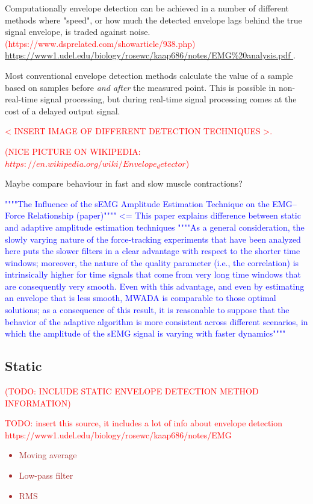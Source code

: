 Computationally envelope detection can be achieved in a number of different methods where "speed", or how much the detected envelope lags behind the true signal envelope, is traded against noise. \textcolor{red}{(https://www.dsprelated.com/showarticle/938.php) \url{https://www1.udel.edu/biology/rosewc/kaap686/notes/EMG%
}}.

Most conventional envelope detection methods calculate the value of a sample based on samples before \textit{and after} the measured point. This is possible in non-real-time signal processing, but during real-time signal processing comes at the cost of a delayed output signal.

\textcolor{red}{< INSERT IMAGE OF DIFFERENT DETECTION TECHNIQUES >.}

\textcolor{red}{(NICE PICTURE ON WIKIPEDIA:  $https://en.wikipedia.org/wiki/Envelope_detector$) }

Maybe compare behaviour in fast and slow muscle contractions?

\textcolor{blue}{""""The Influence of the sEMG Amplitude Estimation Technique on
the EMG–Force Relationship (paper)"""" <= This paper explains difference between static and adaptive amplitude estimation techniques
""""As a general consideration, the slowly varying nature of the force-tracking experiments
that have been analyzed here puts the slower filters in a clear advantage with respect to the shorter time windows; moreover, the nature of the quality parameter (i.e., the correlation) is intrinsically higher for time signals that come from very long time windows that are consequently very smooth. Even with this advantage, and even by estimating an envelope that is less smooth, MWADA is comparable to those optimal solutions; as a consequence of this result, it is reasonable to suppose that the behavior of the adaptive algorithm is more consistent across different scenarios, in which the amplitude of the sEMG signal is varying with faster dynamics""""}

\subsection{Static}
\textcolor{red}{(TODO: INCLUDE STATIC ENVELOPE DETECTION METHOD INFORMATION)}

\textcolor{red}{TODO: insert this source, it includes a lot of info about envelope detection https://www1.udel.edu/biology/rosewc/kaap686/notes/EMG%
}

\textcolor{brown}{\begin{itemize}
    \item Moving average
    \item Low-pass filter
    \item RMS
\end{itemize}}

